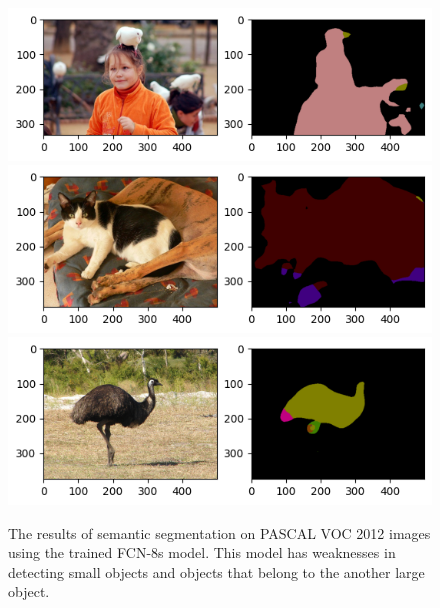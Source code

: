 \documentclass[extendedabs]{bmvc2k}
\begin{document}
\begin{figure}[t]
	\includegraphics[width=\linewidth]{images/result/result13.png}
    \includegraphics[width=\linewidth]{images/result/result14.png}
    \includegraphics[width=\linewidth]{images/result/result15.png}

	\caption{
		The results of semantic segmentation on PASCAL VOC 2012 images using the trained FCN-8s model. This model has weaknesses in detecting small objects and objects that belong to the another large object.  }
        \label{fig:inferresultinaccuracy}
	\vspace{-2mm}
\end{figure}

\newpage

\end{document}
